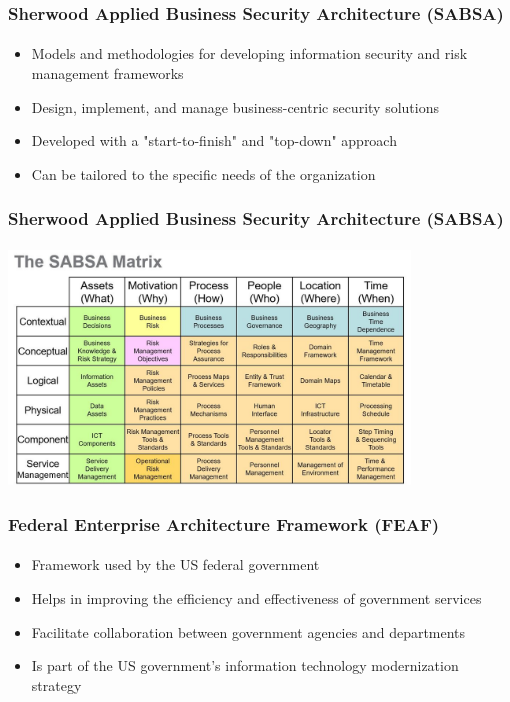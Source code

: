 \documentclass[aspectratio=169, table]{beamer}
\begin{document}
    \begin{frame}
        \frametitle{Sherwood Applied Business Security Architecture (SABSA)}
        \framesubtitle{\hspace{1cm}}
        \begin{itemize}
            \item Models and methodologies for developing information security and risk management frameworks
            \item Design, implement, and manage business-centric security solutions
            \item Developed with a "start-to-finish" and "top-down" approach
            \item Can be tailored to the specific needs of the organization
        \end{itemize}
    \end{frame}

    {
        \begin{frame}
            \frametitle{Sherwood Applied Business Security Architecture (SABSA)}
            \framesubtitle{\hspace{1cm}}
            \begin{center}
                \includegraphics[width=0.8\textwidth]{../figures/sabsa}
            \end{center}
        \end{frame}
    }


    \begin{frame}
        \frametitle{Federal Enterprise Architecture Framework (FEAF)}
        \framesubtitle{\hspace{1cm}}
        \begin{itemize}
            \item Framework used by the US federal government
            \item Helps in improving the efficiency and effectiveness of government services
            \item Facilitate collaboration between government agencies and departments
            \item Is part of the US government's information technology modernization strategy
        \end{itemize}
    \end{frame}
\end{document}
